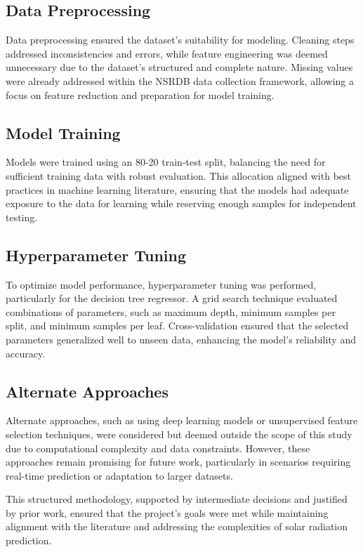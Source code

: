 \documentclass[10pt,twocolumn]{article}
\begin{document}
\begin{itemize}
\subsection{Data Preprocessing}
Data preprocessing ensured the dataset's suitability for modeling. Cleaning steps addressed inconsistencies and errors, while feature engineering was deemed unnecessary due to the dataset's structured and complete nature. Missing values were already addressed within the NSRDB data collection framework, allowing a focus on feature reduction and preparation for model training.

\subsection{Model Training}
Models were trained using an 80-20 train-test split, balancing the need for sufficient training data with robust evaluation. This allocation aligned with best practices in machine learning literature, ensuring that the models had adequate exposure to the data for learning while reserving enough samples for independent testing.

\subsection{Hyperparameter Tuning}
To optimize model performance, hyperparameter tuning was performed, particularly for the decision tree regressor. A grid search technique evaluated combinations of parameters, such as maximum depth, minimum samples per split, and minimum samples per leaf. Cross-validation ensured that the selected parameters generalized well to unseen data, enhancing the model's reliability and accuracy.

\subsection{Alternate Approaches}
Alternate approaches, such as using deep learning models or unsupervised feature selection techniques, were considered but deemed outside the scope of this study due to computational complexity and data constraints. However, these approaches remain promising for future work, particularly in scenarios requiring real-time prediction or adaptation to larger datasets.

This structured methodology, supported by intermediate decisions and justified by prior work, ensured that the project's goals were met while maintaining alignment with the literature and addressing the complexities of solar radiation prediction.





\end{itemize}
\end{document}
